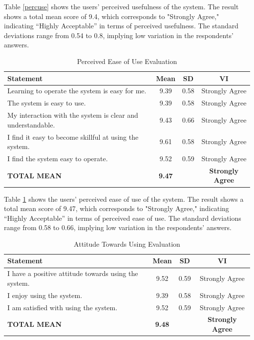 	Table \ref{percuse} shows the users’ perceived usefulness of the system. The result shows a total mean score of 9.4, which corresponds to "Strongly Agree," indicating “Highly Acceptable” in terms of perceived usefulness. The standard deviations range from 0.54 to 0.8, implying low variation in the respondents’ answers.
	
	\begin{table}[h!]
		\centering
		\caption{Perceived Ease of Use Evaluation}
		\label{percease}
		\renewcommand{\arraystretch}{1.2}
		\begin{tabularx}{\linewidth}{|X|c|c|c|}
			\hline
			\textbf{Statement} & \textbf{Mean} & \textbf{SD} & \textbf{VI} \\ \hline
			Learning to operate the system is easy for me.
			& 9.39 & 0.58 & Strongly Agree \\ \hline
			The system is easy to use.
			& 9.39 & 0.58 & Strongly Agree \\ \hline
			My interaction with the system is clear and understandable.
			& 9.43 & 0.66 & Strongly Agree \\ \hline
			I find it easy to become skillful at using the system.
			& 9.61 & 0.58 & Strongly Agree \\ \hline
			I find the system easy to operate.
			& 9.52 & 0.59 & Strongly Agree \\ \hline
			\textbf{TOTAL MEAN} & \textbf{9.47} & & \textbf{Strongly Agree} \\ \hline
		\end{tabularx}
	\end{table}
	
	Table \ref{percease} shows the users’ perceived ease of use of the system. The result shows a total mean score of 9.47, which corresponds to "Strongly Agree," indicating “Highly Acceptable” in terms of perceived ease of use. The standard deviations range from 0.58 to 0.66, implying low variation in the respondents’ answers.
	
	\begin{table}[h!]
		\centering
		\caption{Attitude Towards Using Evaluation}
		\label{attuse}
		\renewcommand{\arraystretch}{1.2}
		\begin{tabularx}{\linewidth}{|X|c|c|c|}
			\hline
			\textbf{Statement} & \textbf{Mean} & \textbf{SD} & \textbf{VI} \\ \hline
			I have a positive attitude towards using the system.
			& 9.52 & 0.59 & Strongly Agree \\ \hline
			I enjoy using the system.
			& 9.39 & 0.58 & Strongly Agree \\ \hline
			I am satisfied with using the system.
			& 9.52 & 0.59 & Strongly Agree \\ \hline
			\textbf{TOTAL MEAN} & \textbf{9.48} & & \textbf{Strongly Agree} \\ \hline
		\end{tabularx}
	\end{table}
	
